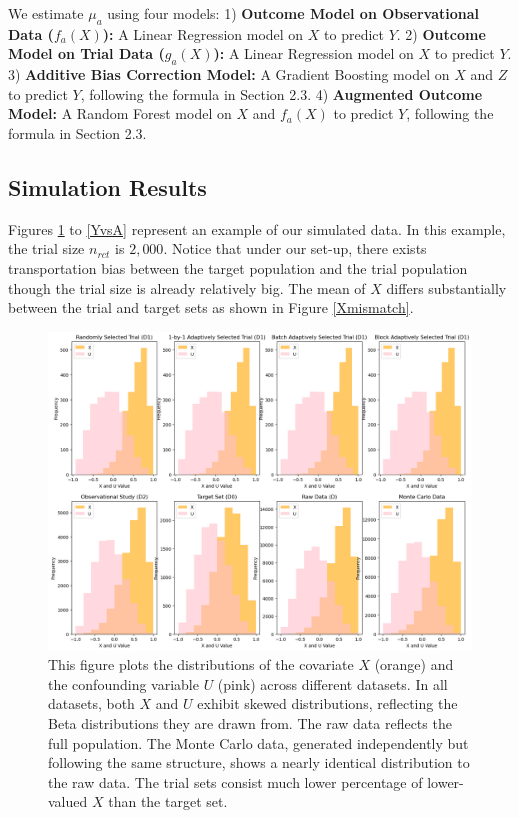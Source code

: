 \documentclass[12pt, oneside]{amsart}
\theoremstyle{definition}
\theoremstyle{remark}
\numberwithin{equation}{section}
\begin{document}
We estimate $\mu_a$ using four models: 1) \textbf{Outcome Model on Observational Data ($f_a(X)$):} A Linear Regression model on $X$ to predict $Y$. 2) \textbf{Outcome Model on Trial Data ($g_a(X)$):} A Linear Regression model on $X$ to predict $Y$. 3) \textbf{Additive Bias Correction Model:} A Gradient Boosting model on $X$ and $Z$ to predict $Y$, following the formula in Section 2.3. 4) \textbf{Augmented Outcome Model:} A Random Forest model on $X$ and $f_a(X)$ to predict $Y$, following the formula in Section 2.3. 


\subsection{Simulation Results}
Figures \ref{XvsU} to \ref{YvsA} represent an example of our simulated data. In this example, the trial size $n_{rct}$ is $2,000$. Notice that under our set-up, there exists transportation bias between the target population and the trial population though the trial size is already relatively big. The mean of $X$ differs substantially between the trial and target sets as shown in Figure \ref{Xmismatch}. 
\begin{figure}[hbt!]
    \centering
    \includegraphics[scale=0.3]{Report/Figure/XvsU.jpg}
    \caption{This figure plots the distributions of the covariate $X$ (orange) and the confounding variable $U$ (pink) across different datasets. In all datasets, both $X$ and $U$ exhibit skewed distributions, reflecting the Beta distributions they are drawn from. The raw data reflects the full population. The Monte Carlo data, generated independently but following the same structure, shows a nearly identical distribution to the raw data. The trial sets consist much lower percentage of lower-valued $X$ than the target set.}
    \label{XvsU}
\end{figure}
\FloatBarrier
\end{document}
